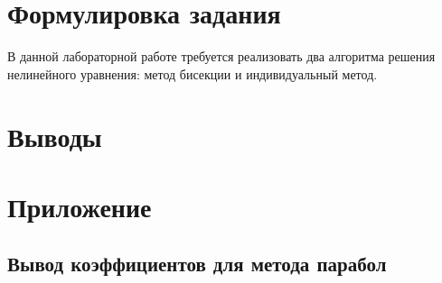 \documentclass[a4paper]{article}
\begin{document}
\pagebreak

\section{Формулировка задания}
В данной лабораторной работе требуется реализовать два алгоритма решения нелинейного уравнения: метод бисекции и индивидуальный метод.

\section{Выводы}

\pagebreak

\section*{Приложение}

\subsection*{Вывод коэффициентов для метода парабол}
\end{document}
